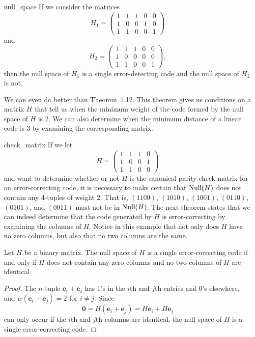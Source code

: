  
\begin{example}{null_space}
If we consider the matrices
\[
H_1 =
\begin{pmatrix}
1 & 1 & 1 & 0 & 0 \\
1 & 0 & 0 & 1 & 0 \\
1 & 1 & 0 & 0 & 1
\end{pmatrix}
\]
and
\[
H_2 =
\begin{pmatrix}
1 & 1 & 1 & 0 & 0 \\
1 & 0 & 0 & 0 & 0 \\
1 & 1 & 0 & 0 & 1
\end{pmatrix},
\]
then the null space of $H_1$ is a single error-detecting code and the
null space of $H_2$ is not. 
\end{example}
 
 
We can even do better than Theorem~7.12. This theorem gives us
conditions on a matrix $H$ that tell us when the minimum weight of
the code formed by the null space of $H$ is 2.  We can also
determine when the minimum distance of a linear code is 3 by
examining the corresponding matrix.
 
 
\begin{example}{check_matrix}
If we let
\[
H =
\begin{pmatrix}
1 & 1 & 1 & 0 \\
1 & 0 & 0 & 1 \\
1 & 1 & 0 & 0
\end{pmatrix}
\]
and  want to determine whether or not $H$ is the canonical
parity-check matrix for an error-correcting code, it is necessary to
make certain that ${\rm Null}(H)$ does not contain any 4-tuples of weight
2. That is, $(1100)$, $(1010)$, $(1001)$, $(0110)$, $(0101)$, and
$(0011)$ must not be in ${\rm Null}(H)$.  The next theorem states that 
we can
indeed determine that the code generated by $H$ is error-correcting by
examining the columns of $H$. Notice in this example that not only
does $H$ have no zero columns, but also that no two columns are the
same. 
\end{example}
 
 
\begin{theorem}
Let $H$ be a binary matrix. The null space of $H$ is a single
error-correcting code if and only if $H$ does not contain any zero
columns and no two columns of $H$ are identical.
\end{theorem}
 
 
\begin{proof}
The $n$-tuple ${\mathbf e}_{i} +{\mathbf e}_{j}$ has 1's in the $i$th and
$j$th entries and 0's elsewhere, and $w( {\mathbf e}_{i} +{\mathbf
e}_{j}) = 2$ for $i \neq j$. Since
\[
{\mathbf 0}
= H({\mathbf e}_{i} +{\mathbf e}_{j})
= H{\mathbf e}_{i} + H{\mathbf e}_{j}
\]
can only occur if the $i$th and $j$th columns are identical, the
null space of $H$ is a single error-correcting code.
\end{proof}
 
